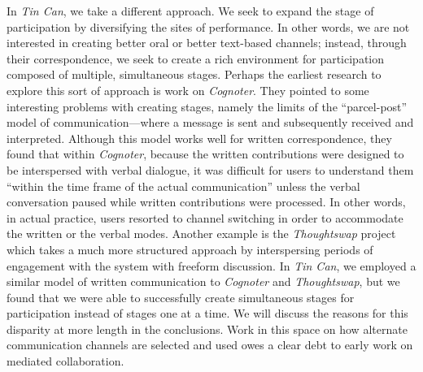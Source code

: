 In \emph{Tin Can}, we take a different approach. We seek to expand the stage of participation by diversifying the sites of performance. In other words, we are not interested in creating better oral or better text-based channels; instead, through their correspondence, we seek to create a rich environment for participation composed of multiple, simultaneous stages.   Perhaps the earliest research to explore this sort of approach is \citet{Tatar:1991jq} work on \emph{Cognoter}. They pointed to some interesting problems with creating stages, namely the limits of the ``parcel-post'' model of communication---where a message is sent and subsequently received and interpreted. Although this model works well for written correspondence, they found that within \emph{Cognoter}, because the written contributions were designed to be interspersed with verbal dialogue, it was difficult for users to understand them ``within the time frame of the actual communication'' unless the verbal conversation paused while written contributions were processed. In other words, in actual practice, users resorted to channel switching in order to accommodate the written or the verbal modes. Another example is the \emph{Thoughtswap} \citep{DickeyKurdziolek:2010wt} project which takes a much more structured approach by interspersing periods of engagement with the system with freeform discussion. In \emph{Tin Can}, we employed a similar model of written communication to \emph{Cognoter} and \emph{Thoughtswap}, but we found that we were able to successfully create simultaneous stages for participation instead of stages one at a time. We will discuss the reasons for this disparity at more length in the conclusions. Work in this space on how alternate communication channels are selected and used owes a clear debt to \citet{Ochsman:1974vu} early work on mediated collaboration.





